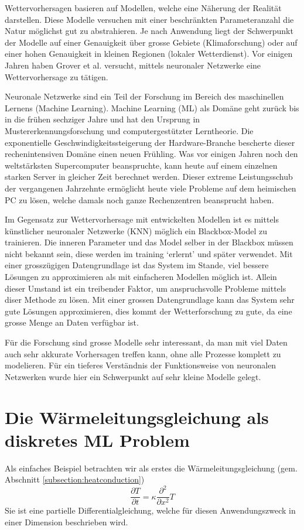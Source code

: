 Wettervorhersagen basieren auf Modellen, welche eine Näherung der
Realität darstellen. Diese Modelle versuchen mit einer beschränkten
Parameteranzahl die Natur möglichst gut zu abstrahieren. Je nach
Anwendung liegt der Schwerpunkt der Modelle auf einer Genauigkeit
über grosse Gebiete (Klimaforschung) oder auf einer hohen Genauigkeit
in kleinen Regionen (lokaler Wetterdienst). Vor einigen Jahren haben
Grover et al. \cite{grover:2015} versucht, mittels neuronaler
Netzwerke eine Wettervorhersage zu tätigen.

Neuronale Netzwerke sind ein Teil der Forschung im Bereich des
maschinellen Lernens (Machine Learning). Machine Learning (ML) als
Domäne geht zurück bis in die frühen sechziger Jahre und hat den
Ursprung in Mustererkennungsforschung und computergestützter
Lerntheorie. Die exponentielle Geschwindigkeitssteigerung der
Hardware-Branche bescherte dieser rechenintensiven Domäne einen
neuen Frühling. Was vor einigen Jahren noch den weltstärksten
Supercomputer beanspruchte, kann heute auf einem einzelnen starken
Server in gleicher Zeit berechnet werden. Dieser extreme Leistungsschub
der vergangenen Jahrzehnte ermöglicht heute viele Probleme auf dem
heimischen PC zu lösen, welche damals noch ganze Rechenzentren
beansprucht haben.

Im Gegensatz zur Wettervorhersage mit entwickelten Modellen ist es
mittels künstlicher neuronaler Netzwerke (KNN) möglich ein
Blackbox-Model zu trainieren. Die inneren Parameter und das Model
selber in der Blackbox müssen nicht bekannt sein, diese werden im
training `erlernt' und später verwendet. Mit einer grosszügigen
Datengrundlage ist das System im Stande, viel bessere Lösungen zu
approximieren als mit einfacheren Modellen möglich ist. Allein
dieser Umstand ist ein treibender Faktor, um anspruchsvolle Probleme
mittels diser Methode zu lösen. Mit einer grossen Datengrundlage
kann das System sehr gute Lösungen approximieren, dies kommt der
Wetterforschung zu gute, da eine grosse Menge an Daten verfügbar
ist.

Für die Forschung sind grosse Modelle sehr interessant, da man mit
viel Daten auch sehr akkurate Vorhersagen treffen kann, ohne alle
Prozesse komplett zu modelieren. Für ein tieferes Verständnis der
Funktionsweise von neuronalen Netzwerken wurde hier ein Schwerpunkt
auf sehr kleine Modelle gelegt.

\section{Die Wärmeleitungsgleichung als diskretes ML Problem\label{section:heat-ml}}
Als einfaches Beispiel betrachten wir als erstes die Wärmeleitungsgleichung
(gem. Abschnitt \ref{subsection:heatconduction})
\begin{equation}
\frac{\partial T}{\partial t} = \kappa \frac{\partial^2}{\partial x^2} T
\end{equation}
Sie ist eine partielle Differentialgleichung, welche für diesen
Anwendungszweck in einer Dimension beschrieben wird.

